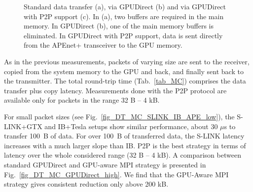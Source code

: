 \documentclass[journal]{IEEEtran}
\begin{document}
\begin{figure}[!t]
\centering
{}
\hspace{1mm}
\caption{Standard data transfer (a), via GPUDirect (b) and via
  GPUDirect with P2P support (c). In (a), two buffers are required in
  the main memory. In GPUDirect (b), one of the main memory buffers is
  eliminated. In GPUDirect with P2P support, data is sent directly
  from the APEnet+ transceiver to the GPU memory.}
\end{figure}
As in the previous measurements, packets of varying size are sent to
the receiver, copied from the system memory to the GPU and back, and
finally sent back to the transmitter.  The total round-trip time
(Tab.~\ref{tab_MC}) comprises the data transfer plus copy latency.
Measurements done with the P2P protocol are available only for packets
in the range 32 B -- 4 kB.

For small packet sizes (see Fig.~\ref{fig_DT_MC_SLINK_IB_APE_low}), the 
S-LINK+GTX and IB+Tesla setups show similar performance, about 
30 $\mu$s to transfer 100~B of data. For over 100~B of transferred data,  
the S-LINK latency increases with a much larger slope than IB.
P2P is the best strategy in terms of latency over the whole considered range 
(32 B -- 4 kB).
A comparison between standard GPUDirect and GPU-aware MPI strategy is presented
in Fig.~\ref{fig_DT_MC_GPUDirect_high}. We find that the GPU-Aware MPI 
strategy gives consistent reduction only above 200 kB. 
\end{document}
